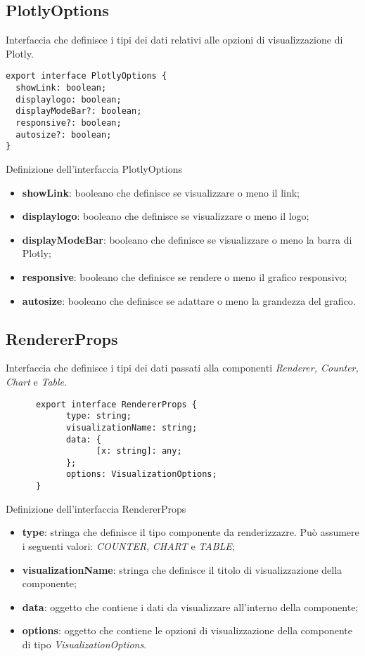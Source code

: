 \subsection{PlotlyOptions}
Interfaccia che definisce i tipi dei dati relativi alle opzioni di visualizzazione di Plotly.
\begin{verbatim}
export interface PlotlyOptions {
  showLink: boolean;
  displaylogo: boolean;
  displayModeBar?: boolean;
  responsive?: boolean;
  autosize?: boolean;
}
\end{verbatim}
\begin{listing}[H]
      \caption{Definizione dell'interfaccia PlotlyOptions}
      \label{listing:plotlyOptions}
\end{listing}
\begin{itemize}
      \item \textbf{showLink}: booleano che definisce se visualizzare o meno il link;
      \item \textbf{displaylogo}: booleano che definisce se visualizzare o meno il logo;
      \item \textbf{displayModeBar}: booleano che definisce se visualizzare o meno la barra di Plotly;
      \item \textbf{responsive}: booleano che definisce se rendere o meno il grafico responsivo;
      \item \textbf{autosize}: booleano che definisce se adattare o meno la grandezza del grafico.
\end{itemize}

\subsection{RendererProps}
Interfaccia che definisce i tipi dei dati passati alla componenti \textit{Renderer, Counter, Chart} e \textit{Table}.
\begin{listing}[H]
      \begin{verbatim}
      export interface RendererProps {
            type: string;
            visualizationName: string;
            data: {
                  [x: string]: any;
            };
            options: VisualizationOptions;
      }
      \end{verbatim}
      \caption{Definizione dell'interfaccia RendererProps}
      \label{listing:rendererProps}
\end{listing}
\begin{itemize}
      \item \textbf{type}: stringa che definisce il tipo componente da renderizzazre. Può assumere i seguenti valori: \textit{COUNTER}, \textit{CHART} e \textit{TABLE};
      \item \textbf{visualizationName}: stringa che definisce il titolo di visualizzazione della componente;
      \item \textbf{data}: oggetto che contiene i dati da visualizzare all'interno della componente;
      \item \textbf{options}: oggetto che contiene le opzioni di visualizzazione della componente di tipo \textit{VisualizationOptions}.
\end{itemize}

